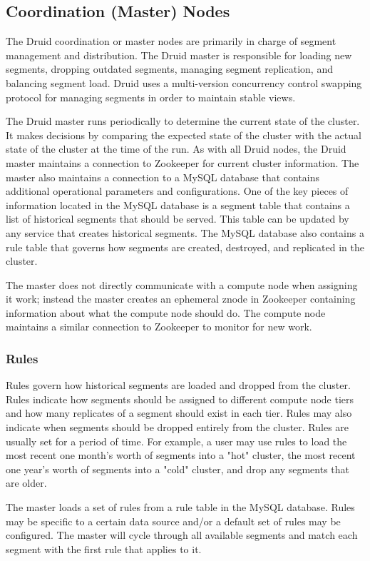 \documentclass{vldb}
\begin{document}
\subsection{Coordination (Master) Nodes}
The Druid coordination or master nodes are primarily in charge of
segment management and distribution. The Druid master is responsible
for loading new segments, dropping outdated segments, managing segment
replication, and balancing segment load. Druid uses a multi-version
concurrency control swapping protocol for managing segments in order
to maintain stable views.

The Druid master runs periodically to determine the current state of
the cluster. It makes decisions by comparing the expected state of the
cluster with the actual state of the cluster at the time of the
run. As with all Druid nodes, the Druid master maintains a connection
to Zookeeper for current cluster information. The master also
maintains a connection to a MySQL database that contains additional
operational parameters and configurations. One of the key pieces of
information located in the MySQL database is a segment table that
contains a list of historical segments that should be served. This
table can be updated by any service that creates historical
segments. The MySQL database also contains a rule table that governs
how segments are created, destroyed, and replicated in the cluster.

The master does not directly communicate with a compute node when
assigning it work; instead the master creates an ephemeral znode in
Zookeeper containing information about what the compute node should
do. The compute node maintains a similar connection to Zookeeper to
monitor for new work.

\subsubsection{Rules}
Rules govern how historical segments are loaded and dropped from the cluster. 
Rules indicate how segments should be assigned to
different compute node tiers and how many replicates of a segment
should exist in each tier. Rules may also indicate when segments
should be dropped entirely from the cluster. Rules are usually set for a period of time. 
For example, a user may use rules to load the most recent one month's worth of segments into a "hot" cluster, 
the most recent one year's worth of segments into a "cold" cluster, and drop any segments that are older.

The master loads a set of
rules from a rule table in the MySQL database. Rules may be specific
to a certain data source and/or a default set of rules may be
configured. The master will cycle through all available segments and
match each segment with the first rule that applies to it.
\end{document}
